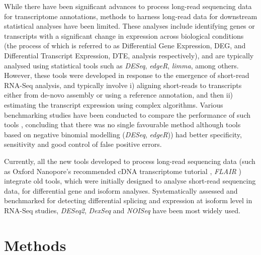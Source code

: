 While there have been significant advances to process long-read sequencing data for transcriptome annotations, methods to harness long-read data for downstream statistical analyses have been limited. These analyses include identifying genes or transcripts with a significant change in expression across biological conditions (the process of which is referred to as Differential Gene Expression, DEG, and Differential Transcript Expression, DTE, analysis respectively), and are typically analysed using statistical tools such as \textit{DESeq}, \textit{edgeR}, \textit{limma}, among others. However, these tools were developed in response to the emergence of short-read RNA-Seq analysis, and typically involve i) aligning short-reads to transcripts either from de-novo assembly or using a reference annotation, and then ii) estimating the transcript expression using complex algorithms. Various benchmarking studies have been conducted to compare the performance of such tools \cite{Teng2016,Rapaport2013}, concluding that there was no single favourable method although tools based on negative binomial modelling (\textit{DESeq}, \textit{edgeR})) had better specificity, sensitivity and good control of false positive errors\cite{Rapaport2013}. 


Currently, all the new tools developed to process long-read sequencing data (such as Oxford Nanopore's recommended cDNA transcriptome tutorial \cite{ONTcdna_transcriptome}, \textit{FLAIR} \cite{Tang2020}) integrate old tools, which were initially designed to analyse short-read sequencing data, for differential gene and isoform analyses. Systematically assessed and benchmarked for detecting differential splicing and expression at isoform level in RNA-Seq studies, \textit{DESeq2}, \textit{DexSeq} and \textit{NOISeq} have been most widely used. 
 

\section{Methods}

